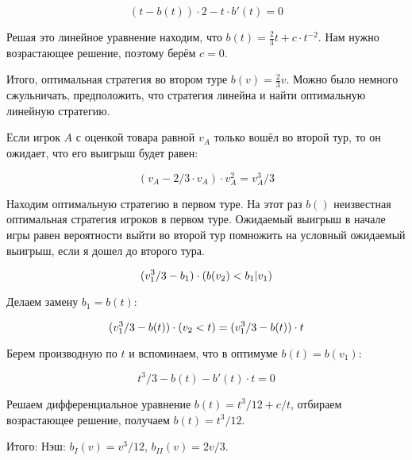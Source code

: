 \documentclass[10pt,a4paper]{article}
\let\P\relax
\DeclareMathOperator{\P}{\mathbb{P}}
\begin{document}
\[
(t-b(t)) \cdot 2 - t \cdot b'(t)=0
\]

Решая это линейное уравнение находим, что $b(t)=\frac{2}{3}t + c\cdot t^{-2}$. Нам нужно возрастающее решение, поэтому берём $c=0$. 

Итого, оптимальная стратегия во втором туре $b(v)=\frac{2}{3}v$. Можно было немного сжульничать, предположить, что стратегия линейна и найти оптимальную линейную стратегию.

Если игрок $A$ с оценкой товара равной $v_A$ только вошёл во второй тур, то он ожидает, что его выигрыш будет равен:

\[
(v_A-2/3\cdot v_A)\cdot v_A^2=v_A^3/3
\]

Находим оптимальную стратегию в первом туре. На этот раз $b()$ неизвестная оптимальная стратегия игроков в первом туре. Ожидаемый выигрыш в начале игры равен вероятности выйти во второй тур помножить на условный ожидаемый выигрыш, если я дошел до второго тура.

\[
(v_1^3/3-b_1) \cdot \P(b(v_2) < b_1 | v_1)
\]

Делаем замену $b_1=b(t)$:

\[
(v_1^3/3-b(t)) \cdot \P(v_2 < t )=(v_1^3/3-b(t))\cdot t
\]

Берем производную по $t$ и вспоминаем, что в оптимуме $b(t)=b(v_1)$:

\[
t^3/3-b(t)-b'(t)\cdot t=0
\]

Решаем дифференциальное уравнение $b(t)=t^3/12+c/t$, отбираем возрастающее решение, получаем $b(t)=t^3/12$.

Итого: Нэш: $b_I(v)=v^3/12$, $b_{II}(v)=2v/3$.
\end{document}
